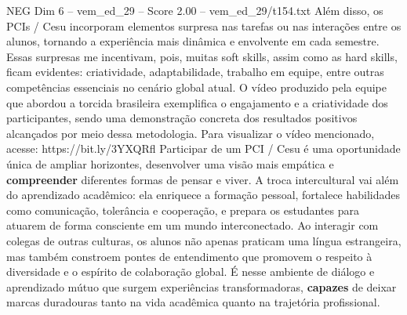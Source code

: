 \begin{textsample}{NEG Dim 6 – vem\_ed\_29 – Score 2.00 – vem\_ed\_29/t154.txt}
Além disso, os PCIs / Cesu incorporam elementos surpresa nas tarefas ou nas interações entre os alunos, tornando a experiência mais dinâmica e envolvente em cada semestre.
Essas surpresas me incentivam, pois, muitas soft skills, assim como as hard skills, ficam evidentes: criatividade, adaptabilidade, trabalho em equipe, entre outras competências essenciais no cenário global atual.
O vídeo produzido pela equipe que abordou a torcida brasileira exemplifica o engajamento e a criatividade dos participantes, sendo uma demonstração concreta dos resultados positivos alcançados por meio dessa metodologia.
Para visualizar o vídeo mencionado, acesse: https://bit.ly/3YXQRfl Participar de um PCI / Cesu é uma oportunidade única de ampliar horizontes, desenvolver uma visão mais empática e \textbf{compreender} diferentes formas de pensar e viver.
A troca intercultural vai além do aprendizado acadêmico: ela enriquece a formação pessoal, fortalece habilidades como comunicação, tolerância e cooperação, e prepara os estudantes para atuarem de forma consciente em um mundo interconectado.
Ao interagir com colegas de outras culturas, os alunos não apenas praticam uma língua estrangeira, mas também constroem pontes de entendimento que promovem o respeito à diversidade e o espírito de colaboração global.
É nesse ambiente de diálogo e aprendizado mútuo que surgem experiências transformadoras, \textbf{capazes} de deixar marcas duradouras tanto na vida acadêmica quanto na trajetória profissional.

\end{textsample}
